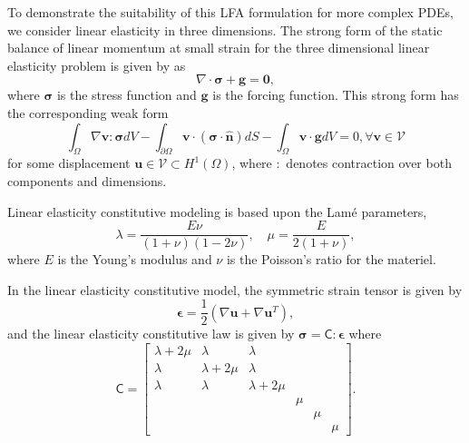 \documentclass[review]{siamart190516}
\begin{document}
To demonstrate the suitability of this LFA formulation for more complex PDEs, we consider linear elasticity in three dimensions.
The strong form of the static balance of linear momentum at small strain for the three dimensional linear elasticity problem is given by \cite{hughes2012finite} as
\begin{equation}
\nabla \cdot \boldsymbol{\sigma} + \boldsymbol{g} = \boldsymbol{0},
\end{equation}
where $\boldsymbol{\sigma}$ is the stress function and $\boldsymbol{g}$ is the forcing function.
This strong form has the corresponding weak form
\begin{equation}
\int_{\Omega} \nabla \mathbf{v} : \boldsymbol{\sigma} dV - \int_{\partial \Omega} \mathbf{v} \cdot \left( \boldsymbol{\sigma} \cdot \hat{\mathbf{n}} \right) dS - \int_{\Omega} \mathbf{v} \cdot \mathbf{g} dV = 0, \forall \mathbf{v} \in \mathcal{V}
\end{equation}
for some displacement $\mathbf{u} \in \mathcal{V} \subset H^1 \left( \Omega \right)$, where $:$ denotes contraction over both components and dimensions.

Linear elasticity constitutive modeling is based upon the Lamé parameters,
\begin{equation}
\lambda = \frac{E \nu}{\left( 1 + \nu \right) \left( 1 - 2 \nu \right)},\quad \mu = \frac{E}{2 \left( 1 + \nu \right)},
\end{equation}
where $E$ is the Young's modulus and $\nu$ is the Poisson's ratio for the materiel.

In the linear elasticity constitutive model, the symmetric strain tensor is given by
\begin{equation}
\boldsymbol{\epsilon} = \frac{1}{2} \left( \nabla \mathbf{u} + \nabla \mathbf{u}^T \right),
\end{equation}
and the linear elasticity constitutive law is given by $\boldsymbol{\sigma} = \mathsf{C} : \boldsymbol{\epsilon}$ where
\begin{equation}
\mathsf{C} =
\begin{bmatrix}
   \lambda + 2\mu & \lambda & \lambda & & & \\
   \lambda & \lambda + 2\mu & \lambda & & & \\
   \lambda & \lambda & \lambda + 2\mu & & & \\
   & & & \mu & & \\
   & & & & \mu & \\
   & & & & & \mu
\end{bmatrix}.
\end{equation}
\end{document}
